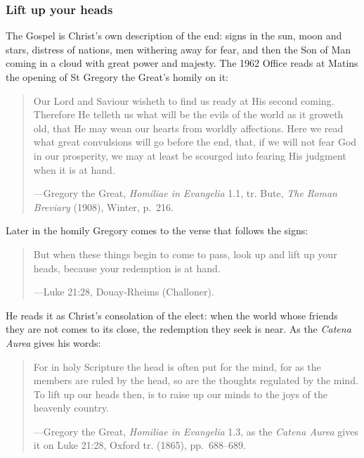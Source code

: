 \subsubsection{Lift up your heads}

The Gospel is Christ's own description of the end: signs in the sun, moon and stars, distress of
nations, men withering away for fear, and then the Son of Man coming in a cloud with great power
and majesty. The 1962 Office reads at Matins the opening of St Gregory the Great's homily on it:

\begin{quote}
Our Lord and Saviour wisheth to find us ready at His second coming. Therefore He telleth us what
will be the evils of the world as it groweth old, that He may wean our hearts from worldly
affections. Here we read what great convulsions will go before the end, that, if we will not fear
God in our prosperity, we may at least be scourged into fearing His judgment when it is at
hand.\par
{\smallskip\noindent\small ---Gregory the Great, \textit{Homiliae in Evangelia} 1.1, tr. Bute,
\textit{The Roman Breviary} (1908), Winter, p.~216.\par}
\end{quote}

Later in the homily Gregory comes to the verse that follows the signs:

\begin{quote}
But when these things begin to come to pass, look up and lift up your heads, because your
redemption is at hand.\par
{\smallskip\noindent\small ---Luke 21:28, Douay-Rheims (Challoner).\par}
\end{quote}

\noindent He reads it as Christ's consolation of the elect: when the world whose friends they are
not comes to its close, the redemption they seek is near. As the \textit{Catena Aurea} gives his
words:

\begin{quote}
For in holy Scripture the head is often put for the mind, for as the members are ruled by the
head, so are the thoughts regulated by the mind. To lift up our heads then, is to raise up our
minds to the joys of the heavenly country.\par
{\smallskip\noindent\small ---Gregory the Great, \textit{Homiliae in Evangelia} 1.3, as the
\textit{Catena Aurea} gives it on Luke 21:28, Oxford tr. (1865), pp.~688--689.\par}
\end{quote}

